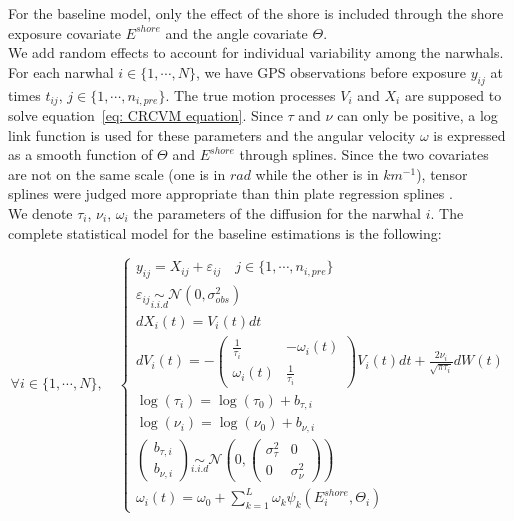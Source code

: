 \documentclass[11pt]{article}
\newcommand {\1}{\mathbb{1}}
\theoremstyle{definition}
\theoremstyle{remark}
\theoremstyle{remark}
\begin{document}
For the baseline model, only the effect of the shore is included through the shore exposure covariate $E^{shore}$ and the angle covariate $\Theta$.\\
We add random effects to account for individual variability among the narwhals.
For each narwhal $i \in \{1, \cdots, N\}$, we have 	GPS observations before exposure $y_{ij}$ at times $t_{ij}$, $j \in \{1,\cdots,n_{i,pre}\}$. The true motion processes $V_i$ and $X_i$ are supposed to solve equation~\eqref{eq: CRCVM equation}. Since $\tau$ and $\nu$ can only be positive, a log link function is used for these parameters and the angular velocity $\omega$ is expressed as a smooth function of $\Theta$ and $E^{shore}$ through splines. Since the two covariates are not on the same scale (one is in $rad$ while the other is in $km^{-1}$), tensor splines were judged more appropriate than thin plate regression splines \cite{wood_generalized_2017}.\\

We denote $\tau_i$, $\nu_i$, $\omega_i$ the parameters of the diffusion for the narwhal $i$. The complete statistical model for the baseline estimations is the following:

\begin{equation}  \forall i \in \{1,\cdots,N\}, \quad \left\{
	\begin{array}{l}
		y_{ij}=X_{ij}+\varepsilon_{ij} \quad j \in \{1,\cdots,n_{i,pre}\}\\
		\varepsilon_{ij} \underset{i.i.d}{\sim} \mathcal{N}(0,\sigma_{obs}^2)  \\
		dX_i(t)=V_i(t)dt  \\
		dV_i(t)=-\begin{pmatrix} 
			\frac{1}{\tau_i} & -\omega_i(t) \\
			\omega_i(t) & \frac{1}{\tau_i}
		\end{pmatrix}V_i(t)dt+\frac{2\nu_i}{\sqrt{\pi \tau_i}} dW(t) \\
		\log(\tau_i)=\log(\tau_0)+b_{\tau,i}\\
		\log(\nu_i)=\log(\nu_0)+b_{\nu,i}  \\
		\begin{pmatrix} b_{\tau,i} \\ b_{\nu,i} \end{pmatrix} \underset{i.i.d}{\sim} \mathcal{N}\left(0,\begin{pmatrix} \sigma_{\tau}^2 & 0 \\ 0 & \sigma_{\nu}^2 \end{pmatrix}\right) \\
		\omega_i(t)=\omega_{0}+\sum_{k=1}^{L} \omega_{k} \psi_k(E_i^{shore},\Theta_i)
	\end{array}
	\right.
	\label{eq: exact baseline model}
\end{equation}
\end{document}
